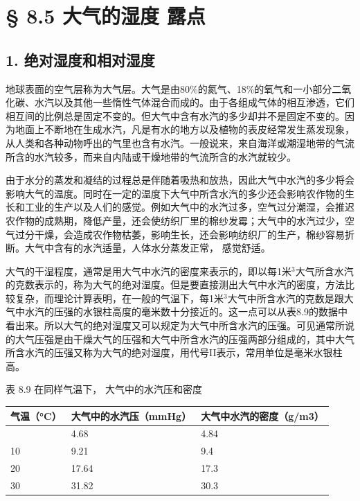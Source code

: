 \section{§ 8.5 大气的湿度
露点}\label{ux5927ux6c14ux7684ux6e7fux5ea6-ux9732ux70b9}

\subsection{1.
绝对湿度和相对湿度}\label{ux7eddux5bf9ux6e7fux5ea6ux548cux76f8ux5bf9ux6e7fux5ea6}

地球表面的空气层称为大气层。大气是由80\%的氮气、18\%的氧气和一小部分二氧化碳、水汽以及其他一些惰性气体混合而成的。由于各组成气体的相互渗透，它们相互间的比例总是固定不变的。但大气中含有水汽的多少却并不是固定不变的。因为地面上不断地在生成水汽，凡是有水的地方以及植物的表皮经常发生蒸发现象，从人类和各种动物呼出的气里也含有水汽。一般说来，来自海洋或潮湿地带的气流所含的水汽较多，而来自内陆或干燥地带的气流所含的水汽就较少。

由于水分的蒸发和凝结的过程总是伴随着吸热和放热，因此大气中水汽的多少将会影响大气的温度。同时在一定的温度下大气中所含水汽的多少还会影响农作物的生长和工业的生产以及人们的感觉。例如大气中的水汽过多，空气过分潮湿，会推迟农作物的成熟期，降低产量，还会使纺织厂里的棉纱发霉；大气中的水汽过少，空气过分干燥，会造成农作物枯萎，影响生长，还会影响纺织厂的生产，棉纱容易折断。大气中含有的水汽适量，人体水分蒸发正常，
感觉舒适。

大气的干湿程度，通常是用大气中水汽的密度来表示的，即以每1米\(^{3}\)大气所含水汽的克数表示的，称为大气的绝对湿度。但是要直接测出大气中水汽的密度，方法比较复杂，而理论计算表明，在一般的气温下，每1米\(^{3}\)大气中所含水汽的克数是跟大气中水汽的压强的水银柱高度的毫米数十分接近的。这一点可以从表8.9的数据中看出来。所以大气的绝对湿度又可以规定为大气中所含水汽的压强。可见通常所说的大气压强是由干燥大气的压强和大气中所含水汽的压强两部分组成的，其中大气所含水汽的压强又称为大气的绝对湿度，用代号II表示，常用单位是毫米水银柱高。

表 8.9 在同样气温下， 大气中的水汽压和密度

{\def\LTcaptype{none} %
\begin{longtable}[]{@{}lll@{}}
\toprule\noalign{}
气温（°C） & 大气中的水汽压（mmHg） & 大气中水汽的密度（g/m3） \\
\midrule\noalign{}
\endhead
\bottomrule\noalign{}
\endlastfoot
0 & 4.68 & 4.84 \\
10 & 9.21 & 9.4 \\
20 & 17.64 & 17.3 \\
30 & 31.82 & 30.3 \\
\end{longtable}
}


